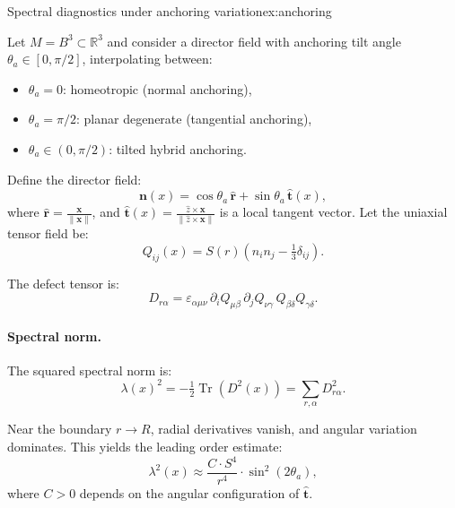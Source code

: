 	\begin{example}{Spectral diagnostics under anchoring variation}{ex:anchoring}
		
		Let \( M = B^3 \subset \mathbb{R}^3 \) and consider a director field with anchoring tilt angle \( \theta_a \in [0, \pi/2] \), interpolating between:
		\begin{itemize}
			\item \( \theta_a = 0 \): homeotropic (normal anchoring),
			\item \( \theta_a = \pi/2 \): planar degenerate (tangential anchoring),
			\item \( \theta_a \in (0, \pi/2) \): tilted hybrid anchoring.
		\end{itemize}
		
		Define the director field:
		\[
		\mathbf{n}(x) = \cos \theta_a \, \hat{\mathbf{r}} + \sin \theta_a \, \hat{\mathbf{t}}(x),
		\]
		where \( \hat{\mathbf{r}} = \frac{\mathbf{x}}{\|\mathbf{x}\|} \), and \( \hat{\mathbf{t}}(x) = \frac{\hat{z} \times \mathbf{x}}{\|\hat{z} \times \mathbf{x}\|} \) is a local tangent vector. Let the uniaxial tensor field be:
		\[
		Q_{ij}(x) = S(r)\left(n_i n_j - \tfrac{1}{3} \delta_{ij}\right).
		\]
		
		The defect tensor is:
		\[
		D_{r\alpha} = \varepsilon_{\alpha\mu\nu} \, \partial_i Q_{\mu\beta} \, \partial_j Q_{\nu\gamma} \, Q_{\beta\delta} Q_{\gamma\delta}.
		\]
		
		\paragraph{Spectral norm.}
		The squared spectral norm is:
		\[
		\lambda(x)^2 = -\tfrac{1}{2} \operatorname{Tr}(D^2(x)) = \sum_{r,\alpha} D_{r\alpha}^2.
		\]
		
		Near the boundary \( r \to R \), radial derivatives vanish, and angular variation dominates. This yields the leading order estimate:
		\[
		\lambda^2(x) \approx \frac{C \cdot S^4}{r^4} \cdot \sin^2(2\theta_a),
		\]
		where \( C > 0 \) depends on the angular configuration of \( \hat{\mathbf{t}} \).
		
			\begin{center}
		\end{center}
		

\end{example}
